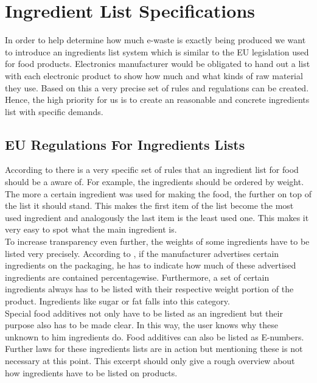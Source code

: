 \section{Ingredient List Specifications} 

In order to help determine how much e-waste is exactly being produced we want to introduce an ingredients list system which is similar to the EU legislation used for food products\cite{eu-ingredients-bmel}. Electronics manufacturer would be obligated to hand out a list with each electronic product to show how much and what kinds of raw material they use. Based on this a very precise set of rules and regulations can be created.\\
Hence, the high priority for us is to create an reasonable and concrete ingredients list with specific demands. 

\subsection{EU Regulations For Ingredients Lists}

According to \cite{eu-ingredients-info-pdf} there is a very specific set of rules that an ingredient list for food should be a aware of. For example, the ingredients should be ordered by weight. The more a certain ingredient was used for making the food, the further on top of the list it should stand. This makes the first item of the list become the most used ingredient and analogously the last item is the least used one. This makes it very easy to spot what the main ingredient is.\\

To increase transparency even further, the weights of some ingredients have to be listed very precisely. According to \cite{eu-ingredients-info-pdf}, if the manufacturer advertises certain ingredients on the packaging, he has to indicate how much of these advertised ingredients are contained percentagewise. Furthermore,  a set of certain ingredients always has to be listed with their respective weight portion of the product. Ingredients like sugar or fat falls into this category. \\
Special food additives not only have to be listed as an ingredient but their purpose also has to be made clear. In this way, the user knows why these unknown to him ingredients do. Food additives can also be listed as E-numbers.  \\

Further laws for these ingredients lists are in action but mentioning these is not necessary at this point. This excerpt should only give a rough overview about how ingredients have to be listed on products. 


